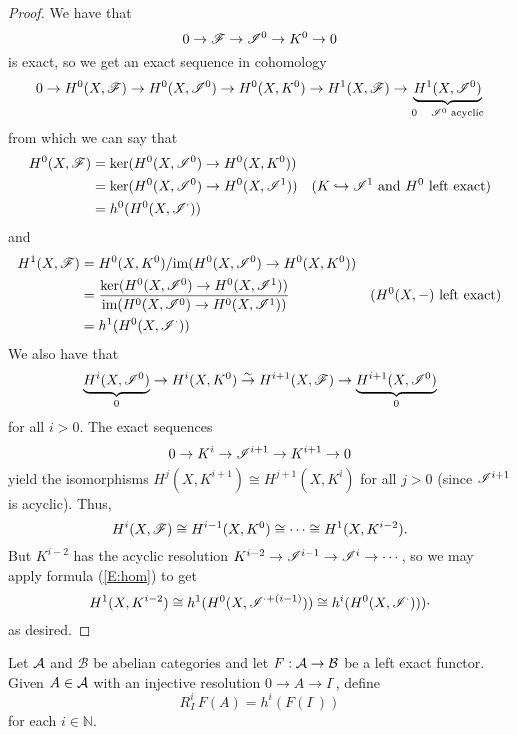\begin{proof}
We have that
\[
    0\to \mathscr{F} \to \mathscr{I}^0\to K^0 \to 0
\]
is exact, so we get an exact sequence in cohomology
\[
    0\to H^0(X,\mathscr{F}) \to H^0(X,\mathscr{I}^0)\to H^0(X,K^0)\to H^1(X,\mathscr{F}) \to
    \underbrace{H^1(X,\mathscr{I}^0)}_{0\quad \mathscr{I}^0\text{ acyclic}}
\]
from which we can say that
\begin{align*}
H^0(X,\mathscr{F}) &=\ker(H^0(X,\mathscr{I}^0)\to H^0(X,K^0))\\
    &= \ker(H^0(X,\mathscr{I}^0)\to H^0(X,\mathscr{I}^1)) & \text{($K\hookrightarrow \mathscr{I}^1$ and $H^0$ left exact)}\\
    &= h^0(H^0(X,\mathscr{I}^{\cdot}))
\end{align*}
and
\begin{align}
H^1(X,\mathscr{F}) &=H^0(X,K^0)/\text{im}(H^0(X,\mathscr{I}^0)\to H^0(X,K^0)) \nonumber \\
    &= \frac{\ker(H^0(X,\mathscr{I}^0)\to H^0(X,\mathscr{I}^1))}{\text{im}(H^0(X,\mathscr{I}^0)\to H^0(X,\mathscr{I}^1))} & \text{($H^0(X,-)$ left exact)} \nonumber \\
    &= h^1(H^0(X,\mathscr{I}^{\cdot})) \label{E:hom}
\end{align}
We also have that
\[
    \underbrace{H^i(X,\mathscr{I}^0)}_0 \to H^i(X,K^0) \stackrel{\sim}{\to} H^{i+1}(X,\mathscr{F})\to
    \underbrace{H^{i+1}(X,\mathscr{I}^0)}_0
\]
for all $i>0$. The exact sequences
\[
    0\to K^i\to \mathscr{I}^{i+1}\to K^{i+1} \to 0
\]
yield the isomorphisms $H^j(X,K^{i+1})\cong H^{j+1}(X,K^i)$ for
all $j>0$ (since $\mathscr{I}^{i+1}$ is acyclic).  Thus,
\[
    H^i(X,\mathscr{F}) \cong H^{i-1}(X,K^0) \cong \cdots \cong
    H^1(X,K^{i-2}).
\]
But $K^{i-2}$ has the acyclic resolution $K^{i-2}\to \mathscr{I}^{i-1}\to
\mathscr{I}^i\to \cdots$, so we may apply formula (\ref{E:hom}) to get
\[
H^1(X,K^{i-2}) \cong h^1(H^0(X,\mathscr{I}^{\cdot+(i-1)})) \cong
h^i(H^0(X,\mathscr{I}^{\cdot})))\cdot
\]
as desired.
\end{proof}

 Let $\mathcal{A}$ and $\mathcal{B}$ be abelian
categories and let $F:\mathcal{A} \to \mathcal{B}$ be a left exact functor.
Given $A\in \mathcal{A}$ with an injective resolution $0\to A\to
I^{\cdot}$, define
\[
    R^i_{I^{\cdot}}F(A) = h^i(F(I^{\cdot}))
\]
for each $i\in \mathbb{N}$.

